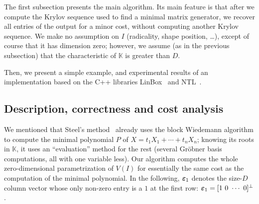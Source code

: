 \documentclass[12pt]{article}
\newcommand{\col}[1]{\bm{\MakeLowercase{#1}}} %
\newcommand{\minpoly}{P}
\newcommand{\lf}{X}
\def\K{\mathbb{K}}
\def\K {\ensuremath{\mathbb{K}}}
\begin{document}
The first subsection presents the main algorithm. Its main feature is
that after we compute the Krylov sequence used to find a minimal
matrix generator, we recover all entries of the output for a minor
cost, without computing another Krylov sequence. We make no assumption
on $I$ (radicality, shape position, \dots), except of course that it
has dimension zero; however, we assume (as in the previous subsection)
that the characteristic of $\K$ is greater than $D$. 

Then, we present a 
simple example, and experimental results of an implementation based on 
the C++ libraries LinBox~\cite{LinBox} and NTL~\cite{NTL}.


\subsection{Description, correctness and cost analysis}\label{ssec:mainalgo}

We mentioned that Steel's method~\cite{Steel15} already uses the block
Wiedemann algorithm to compute the minimal polynomial $\minpoly$ of
$\lf=t_1 X_1 + \cdots + t_n X_n$; knowing its roots in $\K$, it uses
an ``evaluation'' method for the rest (several Gr\"obner basis
computations, all with one variable less).  Our algorithm computes the
whole zero-dimensional parametrization of $V(I)$ for essentially the
same cost as the computation of the minimal polynomial. In the
following, $\col{\varepsilon}_1$ denotes the size-$D$ column vector
whose only non-zero entry is a $1$ at the first row:
$\col{\varepsilon}_1 =[1~0~\cdots~0]^\perp$.
\end{document}
